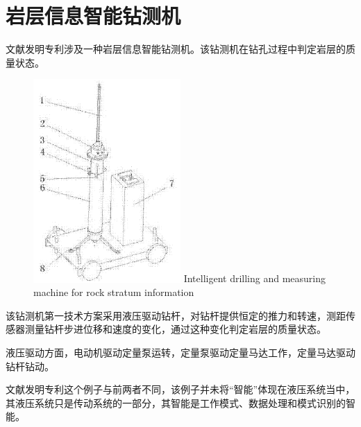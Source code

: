 \section{岩层信息智能钻测机}

文献\parencite{CN107575160A}发明专利涉及一种岩层信息智能钻测机。该钻测机在钻孔过程中判定岩层的质量状态。

\begin{figure}[!htp]
	\centering
	\includegraphics[width=0.5\textwidth]{IMG/driller.png}
		{Intelligent drilling and measuring machine for rock stratum information}
	\label{fig:driller}
\end{figure}

该钻测机第一技术方案采用液压驱动钻杆，对钻杆提供恒定的推力和转速，测距传感器测量钻杆步进位移和速度的变化，通过这种变化判定岩层的质量状态。
	
液压驱动方面，电动机驱动定量泵运转，定量泵驱动定量马达工作，定量马达驱动钻杆钻动。
	
文献\parencite{CN107575160A}发明专利这个例子与前两者不同，该例子并未将“智能”体现在液压系统当中，其液压系统只是传动系统的一部分，其智能是工作模式、数据处理和模式识别的智能。

